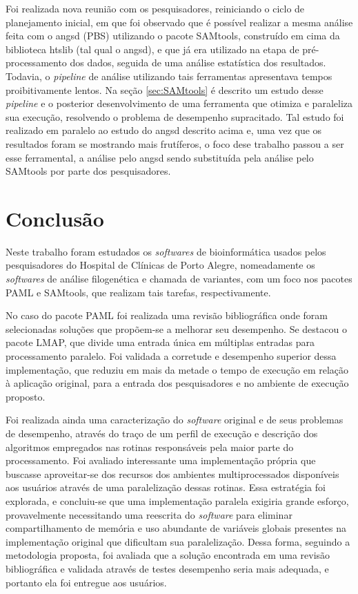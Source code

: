 \documentclass[cic,tc]{iiufrgs}
\begin{document}
Foi realizada nova reunião com os pesquisadores, reiniciando o ciclo de
planejamento inicial, em que foi observado que é possível realizar a mesma
análise feita com o angsd (PBS) utilizando o pacote SAMtools, construído em
cima da biblioteca htslib (tal qual o angsd), e que já era utilizado na etapa
de pré-processamento dos dados, seguida de uma análise estatística dos
resultados. Todavia, o \textit{pipeline} de análise utilizando tais ferramentas
apresentava tempos proibitivamente lentos. Na seção \ref{sec:SAMtools} é
descrito um estudo desse \textit{pipeline} e o posterior desenvolvimento de uma
ferramenta que otimiza e paraleliza sua execução, resolvendo o problema de
desempenho supracitado. Tal estudo foi realizado em paralelo ao estudo do angsd
descrito acima e, uma vez que os resultados foram se mostrando mais frutíferos,
o foco dese trabalho passou a ser esse ferramental, a análise pelo angsd sendo
substituída pela análise pelo SAMtools por parte dos pesquisadores.

%
%
%
%
\chapter{Conclusão}
\label{chap:conc}

Neste trabalho foram estudados os \textit{softwares} de bioinformática usados pelos
pesquisadores do Hospital de Clínicas de Porto Alegre, nomeadamente os
\textit{softwares} de análise filogenética e chamada de variantes, com um foco nos
pacotes PAML e SAMtools, que realizam tais tarefas, respectivamente.

No caso do pacote PAML foi realizada uma revisão bibliográfica onde foram
selecionadas soluções que propõem-se a melhorar seu desempenho. Se destacou o
pacote LMAP, que divide uma entrada única em múltiplas entradas para
processamento paralelo. Foi validada a corretude e desempenho superior dessa
implementação, que reduziu em mais da metade o tempo de execução em relação à
aplicação original, para a entrada dos pesquisadores e no ambiente de execução
proposto.

Foi realizada ainda uma caracterização do \textit{software} original e de seus
problemas de desempenho, através do traço de um perfil de execução e descrição
dos algoritmos empregados nas rotinas responsáveis pela maior parte do
processamento. Foi avaliado interessante uma implementação própria que buscasse
aproveitar-se dos recursos dos ambientes multiprocessados disponíveis aos
usuários através de uma paralelização dessas rotinas. Essa estratégia foi
explorada, e concluiu-se que uma implementação paralela exigiria grande
esforço, provavelmente necessitando uma reescrita do \textit{software} para
eliminar compartilhamento de memória e uso abundante de variáveis globais
presentes na implementação original que dificultam sua paralelização. 
Dessa forma, seguindo a metodologia proposta, foi avaliada que a solução
encontrada em uma revisão bibliográfica e validada através de testes desempenho
seria mais adequada, e portanto ela foi entregue aos usuários.
\end{document}
